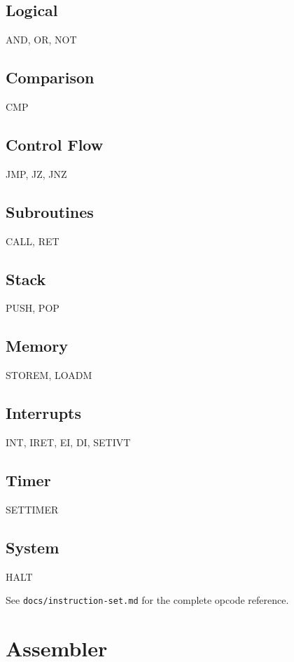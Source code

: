 \documentclass[11pt,a4paper]{article}
\begin{document}
\subsection{Logical}
AND, OR, NOT

\subsection{Comparison}
CMP

\subsection{Control Flow}
JMP, JZ, JNZ

\subsection{Subroutines}
CALL, RET

\subsection{Stack}
PUSH, POP

\subsection{Memory}
STOREM, LOADM

\subsection{Interrupts}
INT, IRET, EI, DI, SETIVT

\subsection{Timer}
SETTIMER

\subsection{System}
HALT

See \texttt{docs/instruction-set.md} for the complete opcode reference.

\section{Assembler}
\label{sec:assembler}
\end{document}
